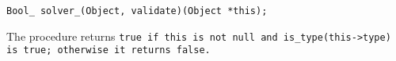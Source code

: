 
\tt{Bool_ solver_(Object, validate)(Object *this);}


The procedure returns \tt{true} if \tt{this} is not null and
\tt{is_type(this->type)} is \tt{true}; otherwise it returns \tt{false}.
